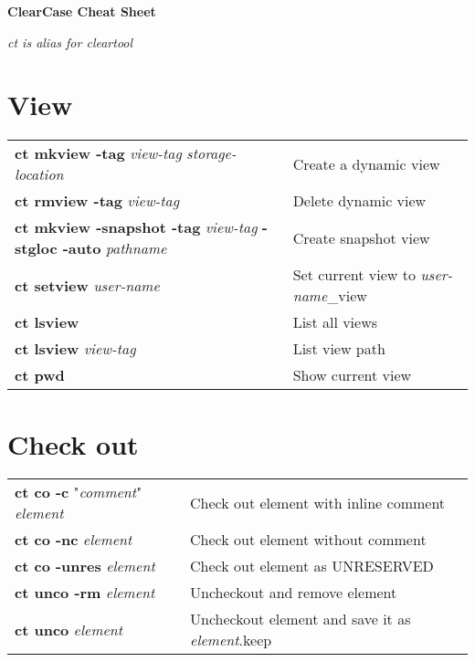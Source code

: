 \documentclass[10pt,twocolumn]{article}
\begin{document}
\renewcommand{\arraystretch}{1.2} %

\begin{center}
  \huge{\textbf{ClearCase Cheat Sheet}} \\
\end{center}

\textit{ct is alias for cleartool} 

\section*{View}
\begin{tabularx}{10.2cm}{>{\hsize=5.3cm}X|>{\hsize=4cm}X}
  \textbf{ct mkview -tag} \textit{view-tag} \textit{storage-location}          & Create a dynamic view \\
  \textbf{ct rmview -tag} \textit{view-tag}           & Delete dynamic view \\
  \textbf{ct mkview -snapshot -tag} \textit{view-tag} \textbf{-stgloc -auto} \textit{pathname}                   & Create snapshot view \\
  \textbf{ct setview} \textit{user-name}                     & Set current view to \textit{user-name}\_view \\
  \textbf{ct lsview}                                         & List all views \\
  \textbf{ct lsview} \textit{view-tag}                       & List view path \\
  \textbf{ct pwd}                                            & Show current view \\
\end{tabularx}

\section*{Check out}
\begin{tabularx}{10.2cm}{l|X}
  \textbf{ct co -c} "\textit{comment}" \textit{element} & Check out element with inline comment \\
  \textbf{ct co -nc} \textit{element}                   & Check out element without comment \\
  \textbf{ct co -unres} \textit{element}                & Check out element as UNRESERVED \\
  \textbf{ct unco -rm} \textit{element}                 & Uncheckout and
  remove element \\
  \textbf{ct unco} \textit{element}                     & Uncheckout element
  and save it as \textit{element}.keep \\
\end{tabularx}
\end{document}
